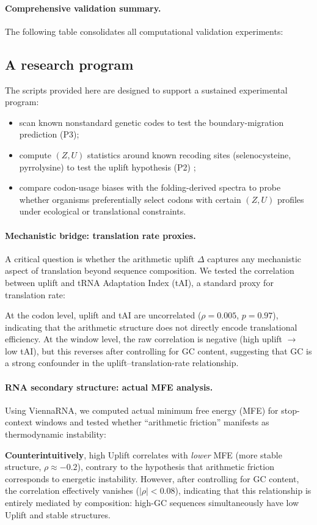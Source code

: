 \paragraph{Comprehensive validation summary.}
The following table consolidates all computational validation experiments:


\subsection{A research program}
\label{sec:program}

The scripts provided here are designed to support a sustained experimental program:
\begin{itemize}
\item scan known nonstandard genetic codes to test the boundary-migration prediction (P3);
\item compute $(Z,U)$ statistics around known recoding sites (selenocysteine, pyrrolysine) to test the uplift hypothesis (P2) \cite{HatfieldGladyshev2002,SrinivasanJamesKrzycki2002};
\item compare codon-usage biases with the folding-derived spectra to probe whether organisms preferentially select codons with certain $(Z,U)$ profiles under ecological or translational constraints.
\end{itemize}

\paragraph{Mechanistic bridge: translation rate proxies.}
A critical question is whether the arithmetic uplift $\Delta$ captures any mechanistic aspect of translation beyond sequence composition.
We tested the correlation between uplift and tRNA Adaptation Index (tAI), a standard proxy for translation rate:

At the codon level, uplift and tAI are uncorrelated ($\rho=0.005$, $p=0.97$), indicating that the arithmetic structure does not directly encode translational efficiency.
At the window level, the raw correlation is negative (high uplift $\to$ low tAI), but this reverses after controlling for GC content, suggesting that GC is a strong confounder in the uplift--translation-rate relationship.

\paragraph{RNA secondary structure: actual MFE analysis.}
Using ViennaRNA, we computed actual minimum free energy (MFE) for stop-context windows and tested whether ``arithmetic friction'' manifests as thermodynamic instability:

\textbf{Counterintuitively}, high Uplift correlates with \emph{lower} MFE (more stable structure, $\rho\approx -0.2$), contrary to the hypothesis that arithmetic friction corresponds to energetic instability.
However, after controlling for GC content, the correlation effectively vanishes ($|\rho|<0.08$), indicating that this relationship is entirely mediated by composition: high-GC sequences simultaneously have low Uplift and stable structures.

